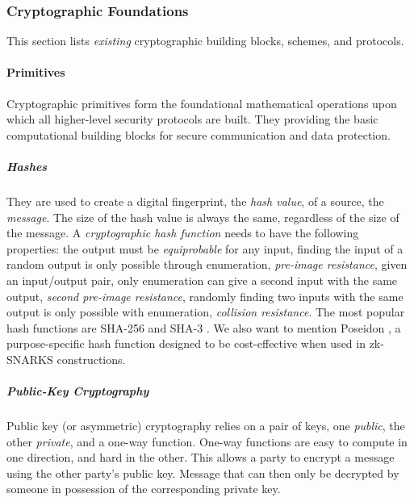 \subsubsection{Cryptographic Foundations}
\label{subsub:cryptography}

This section lists \emph{existing} cryptographic building blocks, schemes, and protocols.


\paragraph{Primitives} Cryptographic primitives form the foundational mathematical operations upon which all higher-level security protocols are built.
They providing the basic computational building blocks for secure communication and data protection.

\subparagraph{Hashes} They are used to create a digital fingerprint, the \emph{hash value}, of a source, the \emph{message}.
The size of the hash value is always the same, regardless of the size of the message.
A \emph{cryptographic hash function} needs to have the following properties:
the output must be \emph{equiprobable} for any input, finding the input of a random output is only possible through enumeration, \emph{pre-image resistance}, given an input/output pair, only enumeration can give a second input with the same output, \emph{second pre-image resistance}, randomly finding two inputs with the same output is only possible with enumeration, \emph{collision resistance}.
The most popular hash functions are SHA-256 \cite{FIPS180-4} and SHA-3 \cite{FIPS202}.
We also want to mention Poseidon \cite{GKRRS21}, a purpose-specific hash function designed to be cost-effective when used in zk-SNARKS constructions.

\subparagraph{Public-Key Cryptography} 
\label{sp:public-key-cryptography}
Public key (or asymmetric) cryptography relies on a pair of keys, one \emph{public}, the other \emph{private}, and a one-way function. 
One-way functions are easy to compute in one direction, and hard in the other. 
This allows a party to encrypt a message using the other party's public key. 
Message that can then only be decrypted by someone in possession of the corresponding private key.

